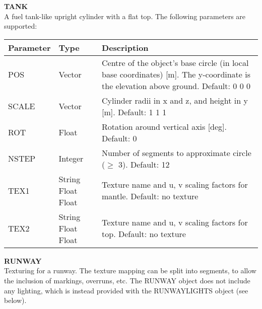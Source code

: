 \documentclass[Orbiter Developer Manual.tex]{subfiles}
\begin{document}
\noindent
\textbf{TANK}\\
A fuel tank-like upright cylinder with a flat top. The following parameters are supported:

	\begin{longtable}{ |p{}|p{}|p{}| }
	\hline\rule{0pt}{2ex}
	\textbf{Parameter} & \textbf{Type} & \textbf{Description}\\
	\hline\rule{0pt}{2ex}
	POS & Vector & Centre of the object's base circle (in local base coordinates) [m]. The y-coordinate is the elevation above ground. Default: 0 0 0\\
	\hline\rule{0pt}{2ex}
	SCALE & Vector & Cylinder radii in x and z, and height in y [m]. Default: 1 1 1\\
	\hline\rule{0pt}{2ex}
	ROT & Float & Rotation around vertical axis [deg]. Default: 0\\
	\hline\rule{0pt}{2ex}
	NSTEP & Integer & Number of segments to approximate circle ($\geq$ 3). Default: 12\\
	\hline\rule{0pt}{2ex}
	TEX1 & String Float Float & Texture name and u, v scaling factors for mantle. Default: no texture\\
	\hline\rule{0pt}{2ex}
	TEX2 & String Float Float & Texture name and u, v scaling factors for top. Default: no texture\\
	\hline
	\end{longtable}

\noindent
\textbf{RUNWAY}\\
Texturing for a runway. The texture mapping can be split into segments, to allow the inclusion of markings, overruns, etc. The RUNWAY object does not include any lighting, which is instead provided with the RUNWAYLIGHTS object (see below).
\end{document}
